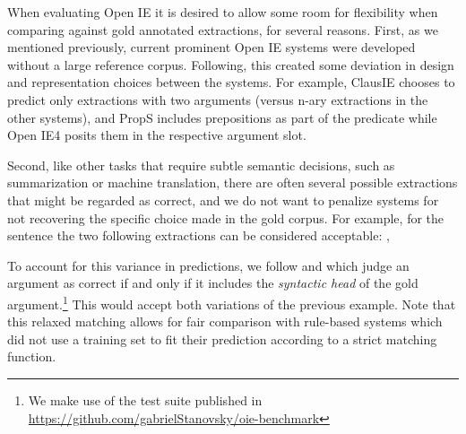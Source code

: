 

When evaluating Open IE it is desired to allow some room for flexibility when comparing against gold annotated extractions, for several reasons.
First, as we mentioned previously, current prominent Open IE systems were developed without a large reference
corpus. Following, this created some deviation in design and representation choices between the systems.
For example, ClausIE chooses to predict only extractions with two arguments (versus n-ary extractions in the other systems), and PropS includes prepositions as part of the predicate while Open IE4 posits them in the respective
argument slot.

Second, like other tasks that require subtle semantic decisions, such as summarization or machine translation,
there are often several possible  extractions that might be regarded as correct, and we do not want to penalize systems for not
recovering the specific choice made in the gold corpus.
For example, for the sentence  the two following
extractions can be considered acceptable: ,

To account for  this variance in predictions, we follow  and  which judge an argument as correct if and only if it includes the \emph{syntactic head} of the gold argument.\footnote{We make use of the test suite published in \url{https://github.com/gabrielStanovsky/oie-benchmark}}
This would accept both variations of the previous example.
Note that this relaxed matching allows for fair comparison with rule-based systems which did not use a training
set to fit their prediction according to a strict matching function.

